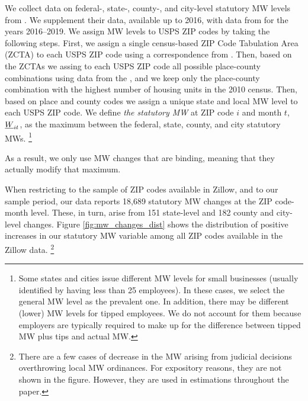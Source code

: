 We collect data on federal-, state-, county-, and city-level statutory MW levels 
from \textcite{VaghulZipperer2016}.
We supplement their data, available up to 2016, with data from 
\textcite{BerkeleyLaborCenter} for the years 2016--2019.
We assign MW levels to USPS ZIP codes by taking the following steps.
First, we assign a single census-based ZIP Code Tabulation Area (ZCTA) to each 
USPS ZIP code using a correspondence from \textcite{UDSMapper}.
Then, based on the ZCTAs we assing to each USPS ZIP code all possible 
place-county combinations using data from the \textcite{MissouriCDC}, and 
we keep only the place-county combination with the highest number of housing 
units in the 2010 census.
Then, based on place and county codes we assign a unique state and local MW 
level to each USPS ZIP code.
We define \textit{the statutory MW} at ZIP code $i$ and month $t$, $\underline{W}_{it}$, 
as the maximum between the federal, state, county, and city statutory MWs.%
\footnote{Some states and cities issue different MW levels for small businesses
(usually identified by having less than 25 employees).
In these cases, we select the general MW level as the prevalent one.
In addition, there may be different (lower) MW levels for tipped employees.
We do not account for them because employers are typically required to make up 
for the difference between tipped MW plus tips and actual MW.}

As a result, we only use MW changes that are binding, meaning that they actually 
modify that maximum.

When restricting 
to the sample of ZIP codes available in Zillow, and 
to our sample period, our data reports 
18,689 statutory MW changes at the ZIP code-month level.
These, in turn, arise from 
151 state-level and 
182 county and city-level changes.
%
%
Figure \ref{fig:mw_changes_dist} shows the distribution of positive increases in
our statutory MW variable among all ZIP codes available in the Zillow data.%
\footnote{There are a few cases of decrease in the MW arising from judicial 
decisions overthrowing local MW ordinances.
For expository reasons, they are not shown in the figure.
However, they are used in estimations throughout the paper.}


